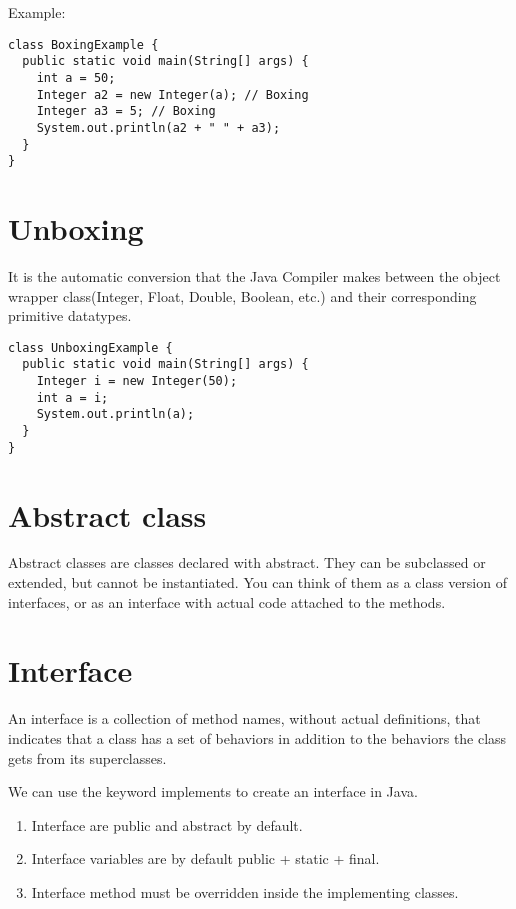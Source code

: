 \documentclass[a4paper, 12pt]{scrarticle}
\begin{document}
Example:
\begin{verbatim}
class BoxingExample {
  public static void main(String[] args) {
    int a = 50;
    Integer a2 = new Integer(a); // Boxing
    Integer a3 = 5; // Boxing
    System.out.println(a2 + " " + a3);
  }
}
\end{verbatim}

\section{Unboxing}
It is the automatic conversion that the Java Compiler makes between the object wrapper class(Integer, Float, Double, Boolean, etc.) and their corresponding primitive datatypes.

\begin{verbatim}
class UnboxingExample {
  public static void main(String[] args) {
    Integer i = new Integer(50);
    int a = i;
    System.out.println(a);
  }
}
\end{verbatim}

\section{Abstract class}
Abstract classes are classes declared with abstract. They can be subclassed or extended, but cannot be instantiated. You can think of them as a class version of interfaces, or as an interface with actual code attached to the methods.

\section{Interface}
An interface is a collection of method names, without actual definitions, that indicates that a class has a set of behaviors in addition to the behaviors the class gets from its superclasses.

We can use the keyword implements to create an interface in Java.
\begin{enumerate}
  \item Interface are public and abstract by default.
  \item Interface variables are by default public + static + final.
  \item Interface method must be overridden inside the implementing classes.
\end{enumerate}
\end{document}
